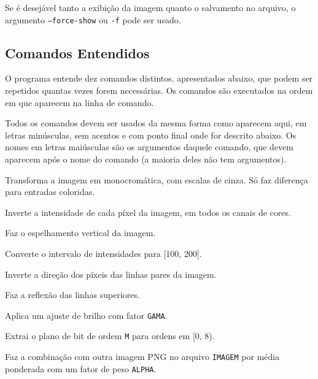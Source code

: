 Se é desejável tanto a exibição da imagem quanto o salvamento no arquivo, o argumento \texttt{--force-show} ou \texttt{-f} pode ser usado.

\subsection{Comandos Entendidos}

O programa entende dez comandos distintos, apresentados abaixo, que podem ser repetidos quantas vezes forem necessárias. Os comandos são executados na ordem em que aparecem na linha de comando.

Todos os comandos devem ser usados da mesma forma como aparecem aqui, em letras minúsculas, sem acentos e com ponto final onde for descrito abaixo. Os nomes em letras maiúsculas são os argumentos daquele comando, que devem aparecem após o nome do comando (a maioria deles não tem argumentos).

\begin{description}[labelwidth=\widthof{\texttt{combina IMAGEM ALPHA}}, leftmargin=!, itemsep=1.5em]
    \item[\texttt{monocromatico}] Transforma a imagem em monocromática, com escalas de cinza. Só faz diferença para entradas coloridas.

    \item[\texttt{negativo}] Inverte a intensidade de cada píxel da imagem, em todos os canais de cores.

    \item[\texttt{esp.verical}] Faz o espelhamento vertical da imagem.

    \item[\texttt{conv.intervalo}] Converte o intervalo de intensidades para [100, 200].

    \item[\texttt{inverte.pares}] Inverte a direção dos píxeis das linhas pares da imagem.

    \item[\texttt{reflexao}] Faz a reflexão das linhas superiores.

    \item[\texttt{aj.brilho GAMA}] Aplica um ajuste de brilho com fator \texttt{GAMA}.

    \item[\texttt{plano.bit M}] Extrai o plano de bit de ordem \texttt{M} para ordens em [0, 8).

    \item[\texttt{combina IMAGEM ALPHA}] Faz a combinação com outra imagem PNG no arquivo \texttt{IMAGEM} por média ponderada com um fator de peso \texttt{ALPHA}.

\end{description}
